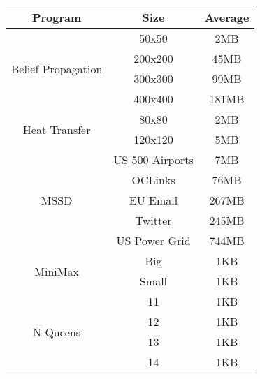 \begin{tabular}{c | c | c } \hline
	\textbf{Program} & \textbf{Size} & \textbf{Average} \\ \hline \hline
	\multirow{4}{*}{Belief Propagation}  & 50x50 & 2MB\\
		 & 200x200 & 45MB\\
		 & 300x300 & 99MB\\
		 & 400x400 & 181MB\\
	\hline
	\multirow{2}{*}{Heat Transfer}  & 80x80 & 2MB\\
		 & 120x120 & 5MB\\
	\hline
	\multirow{5}{*}{MSSD}  & US 500 Airports & 7MB\\
		 & OCLinks & 76MB\\
		 & EU Email & 267MB\\
		 & Twitter & 245MB\\
		 & US Power Grid & 744MB\\
	\hline
	\multirow{2}{*}{MiniMax}  & Big & 1KB\\
		 & Small & 1KB\\
	\hline
	\multirow{4}{*}{N-Queens}  & 11 & 1KB\\
		 & 12 & 1KB\\
		 & 13 & 1KB\\
		 & 14 & 1KB\\
	\hline
\end{tabular}
